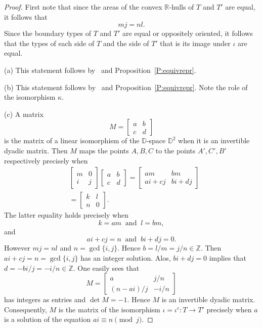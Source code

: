 \documentclass[12pt]{amsart}
\def\mbR{\mathbb{R}}
\def\mbZ{\mathbb{Z}}
\def\mbD{\mathbb{D}}
\theoremstyle{plain}
\theoremstyle{definition}
\numberwithin{equation}{section}
\begin{document}
\begin{proof}
First note that since the areas of the convex $\mbR$-hulls of $T$ and $T'$ are equal, it follows that
\begin{equation}\label{E:equalareas}
mj = nl.
\end{equation}
Since the boundary types of $T$ and $T'$ are equal or oppositely oriented, it follows that
the types of each side of $T$ and the side of $T'$ that is its image under $\iota$ are equal.

(a) This statement follows by~\cite[Prop.~5.1]{MR25}
and Proposition~\ref{P:equivrepr}.

(b) This statement follows by~\cite[Rem.~5.2]{MR25}
and Proposition~\ref{P:equivrepr}.
Note the role of the isomorphism $\kappa$.

(c) A matrix
\begin{equation}
M =
\begin{bmatrix}
	a&b\\
	c&d
\end{bmatrix}
\end{equation}
is the matrix of a linear isomorphism of the $\mbD$-space $\mbD^2$ when it is an
invertible dyadic matrix. Then $M$ maps the points $A, B, C$ to the points $A', C', B'$
respectively precisely when
\begin{align*}
&
\begin{bmatrix}
		m&0\\
		i&j
	\end{bmatrix}
	\begin{bmatrix}
		a&b\\
		c&d
	\end{bmatrix}
    =\begin{bmatrix}
	am&bm\\
	ai+cj&bi+dj
    \end{bmatrix}\\
    &= \begin{bmatrix}
     k&l\\
	 n&0
    \end{bmatrix}.
\end{align*}
The latter equality holds precisely when
\begin{equation}
k = am \ \mbox{ and } \ l = bm,
\end{equation}
and
\begin{equation}
ai + cj = n\ \mbox{ and } \ bi + dj = 0.
\end{equation}
However $mj = nl$ and $n = \gcd\{i,j\}$. Hence $b = l/m = j/n \in \mbZ$.
Then $ai +cj = n = \gcd\{i,j\}$ has an integer solution. Alos, $bi + dj = 0$ implies that
$d = -bi/j = -i/n \in \mbZ$. One easily sees that
\begin{equation}
M =
\begin{bmatrix}
	a&j/n\\
	(n-ai)/j&-i/n
\end{bmatrix}
\end{equation}
has integers as entries and $\det M = -1$. Hence $M$ is an invertible dyadic matrix.
Consequently, $M$ is the matrix of the isomorphism $\iota = \iota^c: T \rightarrow T'$ precisely when $a$ is a solution of the equation $ai \equiv n \pmod{j}$.


\end{proof}
\end{document}
